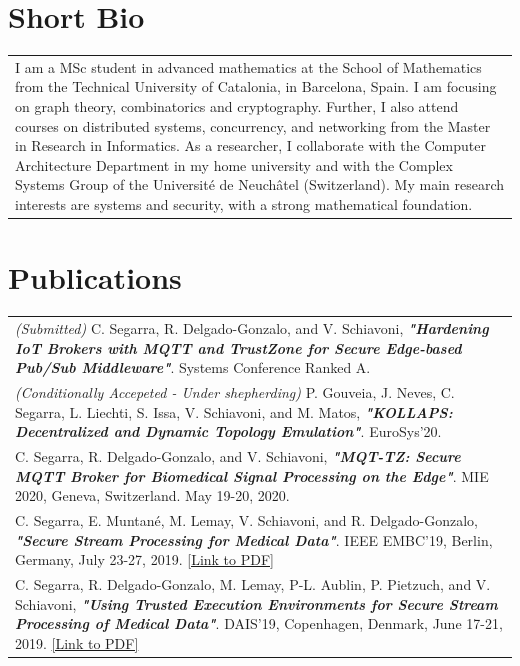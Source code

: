 \documentclass[a4paper,10pt]{article} %
\begin{document}
\section{Short Bio}
\begin{tabular}{p{}}
    I am a MSc student in advanced mathematics at the School of Mathematics from the Technical University of Catalonia, in Barcelona, Spain.
    I am focusing on graph theory, combinatorics and cryptography.
    Further, I also attend courses on distributed systems, concurrency, and networking from the Master in Research in Informatics.
    As a researcher, I collaborate with the Computer Architecture Department in my home university and with the Complex Systems Group of the Universit\'e de Neuch\^atel (Switzerland).
    My main research interests are systems and security, with a strong mathematical foundation.
\end{tabular}

\section{Publications}
\begin{tabular}{p{}}
    \textit{(Submitted)} C. Segarra, R. Delgado-Gonzalo, and V. Schiavoni, \textbf{\textit{"Hardening IoT Brokers with MQTT and TrustZone for Secure Edge-based Pub/Sub Middleware"}}. Systems Conference Ranked A. \\[3pt]
    \textit{(Conditionally Accepeted - Under shepherding)} P. Gouveia, J. Neves, C. Segarra, L. Liechti, S. Issa, V. Schiavoni, and M. Matos, \textbf{\textit{"KOLLAPS: Decentralized and Dynamic Topology Emulation"}}. EuroSys'20. \\[3pt]
    C. Segarra, R. Delgado-Gonzalo, and V. Schiavoni, \textbf{\textit{"MQT-TZ: Secure MQTT Broker for Biomedical Signal Processing on the Edge"}}. MIE 2020, Geneva, Switzerland. May 19-20, 2020. \\[3pt]
    C. Segarra, E. Muntan\'e, M. Lemay, V. Schiavoni, and  R. Delgado-Gonzalo, \textbf{\textit{"Secure Stream Processing for Medical Data"}}. IEEE EMBC'19, Berlin, Germany, July 23-27, 2019. \href{https://arxiv.org/pdf/1907.12242.pdf}{[Link to PDF]} \\[3pt]
    C. Segarra, R. Delgado-Gonzalo, M. Lemay, P-L. Aublin, P. Pietzuch, and V. Schiavoni, \textbf{\textit{"Using Trusted Execution Environments for Secure Stream Processing of Medical Data"}}. DAIS'19, Copenhagen, Denmark, June 17-21, 2019. \href{https://arxiv.org/pdf/1906.07072.pdf}{[Link to PDF]} \\
\end{tabular}
\end{document}
